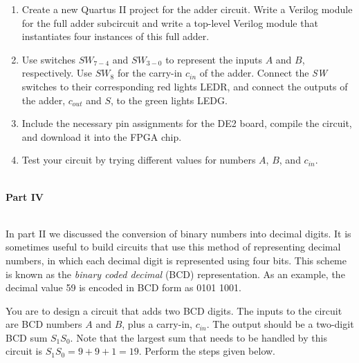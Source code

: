 \documentclass[psfig,10pt,fullpage]{article}
\begin{document}
\begin{enumerate}
\item Create a new Quartus II project for the adder circuit. Write a Verilog module
for the full adder subcircuit and write a top-level Verilog module that instantiates four 
instances of this full adder.
\item Use switches $SW_{7-4}$ and $SW_{3-0}$ to represent the inputs $A$ and $B$, respectively.
Use $SW_{8}$ for the carry-in $c_{in}$ of the adder. Connect the {\it SW} switches to
their corresponding red lights LEDR, and connect the outputs of the adder, $c_{out}$ and
$S$, to the green lights LEDG.
\item Include the necessary pin assignments for the DE2 board, compile the circuit, and
download it into the FPGA chip.
\item Test your circuit by trying different values for numbers $A$, $B$, and $c_{in}$.
\end{enumerate}

~\\
\noindent
{\bf Part IV}

~\\
In part II we discussed the conversion of binary numbers into decimal digits. It is
sometimes useful to build circuits that use this method of representing decimal numbers,
in which each decimal digit is represented using four bits. This scheme is known as the
{\it binary coded decimal} (BCD) representation. As an example, the decimal value 59 is
encoded in BCD form as 0101 1001.

You are to design a circuit that adds two BCD digits. The inputs to the circuit
are BCD numbers $A$ and $B$, plus a carry-in, $c_{in}$. The output should be a two-digit
BCD sum $S_1 S_0$. Note that the largest sum that needs to be handled by this circuit
is $S_1 S_0 = 9 + 9 + 1 = 19$. Perform the steps given below.
\end{document}
